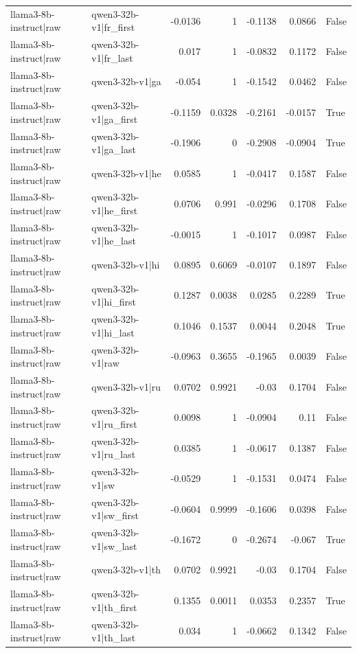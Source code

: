 \begin{table}
\begin{tabular}{l l r r r r l}
llama3-8b-instruct|raw & qwen3-32b-v1|fr_first & -0.0136 & 1 & -0.1138 & 0.0866 & False \\
llama3-8b-instruct|raw & qwen3-32b-v1|fr_last & 0.017 & 1 & -0.0832 & 0.1172 & False \\
llama3-8b-instruct|raw & qwen3-32b-v1|ga & -0.054 & 1 & -0.1542 & 0.0462 & False \\
llama3-8b-instruct|raw & qwen3-32b-v1|ga_first & -0.1159 & 0.0328 & -0.2161 & -0.0157 & True \\
llama3-8b-instruct|raw & qwen3-32b-v1|ga_last & -0.1906 & 0 & -0.2908 & -0.0904 & True \\
llama3-8b-instruct|raw & qwen3-32b-v1|he & 0.0585 & 1 & -0.0417 & 0.1587 & False \\
llama3-8b-instruct|raw & qwen3-32b-v1|he_first & 0.0706 & 0.991 & -0.0296 & 0.1708 & False \\
llama3-8b-instruct|raw & qwen3-32b-v1|he_last & -0.0015 & 1 & -0.1017 & 0.0987 & False \\
llama3-8b-instruct|raw & qwen3-32b-v1|hi & 0.0895 & 0.6069 & -0.0107 & 0.1897 & False \\
llama3-8b-instruct|raw & qwen3-32b-v1|hi_first & 0.1287 & 0.0038 & 0.0285 & 0.2289 & True \\
llama3-8b-instruct|raw & qwen3-32b-v1|hi_last & 0.1046 & 0.1537 & 0.0044 & 0.2048 & True \\
llama3-8b-instruct|raw & qwen3-32b-v1|raw & -0.0963 & 0.3655 & -0.1965 & 0.0039 & False \\
llama3-8b-instruct|raw & qwen3-32b-v1|ru & 0.0702 & 0.9921 & -0.03 & 0.1704 & False \\
llama3-8b-instruct|raw & qwen3-32b-v1|ru_first & 0.0098 & 1 & -0.0904 & 0.11 & False \\
llama3-8b-instruct|raw & qwen3-32b-v1|ru_last & 0.0385 & 1 & -0.0617 & 0.1387 & False \\
llama3-8b-instruct|raw & qwen3-32b-v1|sw & -0.0529 & 1 & -0.1531 & 0.0474 & False \\
llama3-8b-instruct|raw & qwen3-32b-v1|sw_first & -0.0604 & 0.9999 & -0.1606 & 0.0398 & False \\
llama3-8b-instruct|raw & qwen3-32b-v1|sw_last & -0.1672 & 0 & -0.2674 & -0.067 & True \\
llama3-8b-instruct|raw & qwen3-32b-v1|th & 0.0702 & 0.9921 & -0.03 & 0.1704 & False \\
llama3-8b-instruct|raw & qwen3-32b-v1|th_first & 0.1355 & 0.0011 & 0.0353 & 0.2357 & True \\
llama3-8b-instruct|raw & qwen3-32b-v1|th_last & 0.034 & 1 & -0.0662 & 0.1342 & False \\

\end{tabular}
\end{table}
